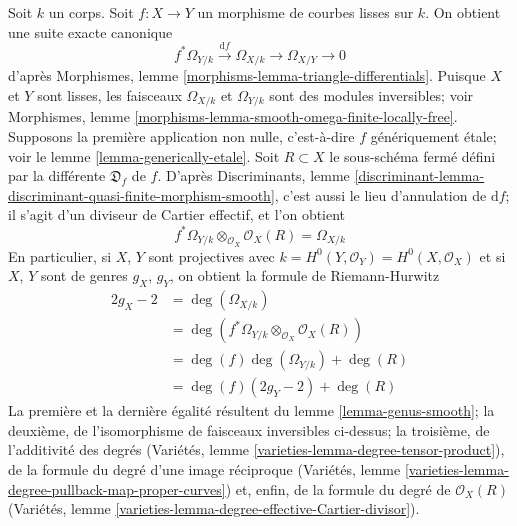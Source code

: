 \noindent
Soit $k$ un corps. Soit $f : X \to Y$ un morphisme de courbes lisses sur $k$. On obtient une suite exacte canonique $$
f^*\Omega_{Y/k} \xrightarrow{\text{d}f} \Omega_{X/k}
\longrightarrow \Omega_{X/Y} \longrightarrow 0
$$ d'après Morphismes, lemme \ref{morphisms-lemma-triangle-differentials}. Puisque $X$ et $Y$ sont lisses, les faisceaux $\Omega_{X/k}$ et $\Omega_{Y/k}$ sont des modules inversibles; voir Morphismes, lemme \ref{morphisms-lemma-smooth-omega-finite-locally-free}. Supposons la première application non nulle, c'est-à-dire $f$ génériquement \'etale; voir le lemme \ref{lemma-generically-etale}. Soit $R \subset X$ le sous-schéma fermé défini par la différente $\mathfrak{D}_f$ de $f$. D'après Discriminants, lemme \ref{discriminant-lemma-discriminant-quasi-finite-morphism-smooth}, c'est aussi le lieu d'annulation de $\text{d}f$; il s'agit d'un diviseur de Cartier effectif, et l'on obtient $$
f^*\Omega_{Y/k} \otimes_{\mathcal{O}_X} \mathcal{O}_X(R) = \Omega_{X/k}
$$ En particulier, si $X$, $Y$ sont projectives avec $k = H^0(Y, \mathcal{O}_Y) = H^0(X, \mathcal{O}_X)$ et si $X$, $Y$ sont de genres $g_X$, $g_Y$, on obtient la formule de Riemann-Hurwitz \begin{align*}
2g_X - 2 & =
\deg(\Omega_{X/k}) \\
& =
\deg(f^*\Omega_{Y/k} \otimes_{\mathcal{O}_X} \mathcal{O}_X(R)) \\
& =
\deg(f) \deg(\Omega_{Y/k}) + \deg(R) \\
& =
\deg(f) (2g_Y - 2) + \deg(R)
\end{align*} La première et la dernière égalité résultent du lemme \ref{lemma-genus-smooth}; la deuxième, de l'isomorphisme de faisceaux inversibles ci-dessus; la troisième, de l'additivité des degrés (Variétés, lemme \ref{varieties-lemma-degree-tensor-product}), de la formule du degré d'une image réciproque (Variétés, lemme \ref{varieties-lemma-degree-pullback-map-proper-curves}) et, enfin, de la formule du degré de $\mathcal{O}_X(R)$ (Variétés, lemme \ref{varieties-lemma-degree-effective-Cartier-divisor}).

